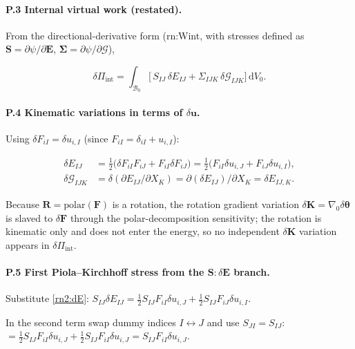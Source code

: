 \documentclass[11pt]{article}
\begin{document}
\paragraph{P.3 Internal virtual work (restated).}

From the directional-derivative form (rn:Wint, with stresses defined as $\mathbf{S}=\partial\psi/\partial\mathbf{E}$, $\boldsymbol{\Sigma}=\partial\psi/\partial\bm{\mathcal{G}}$),

\begin{equation}
\delta\Pi_{\mathrm{int}}
= \int_{\mathcal{B}_0}
  \bigl[\,S_{IJ}\,\delta E_{IJ}
        +\Sigma_{IJK}\,\delta\mathcal{G}_{IJK}\bigr]\,
  \mathrm{d}V_0.
\label{rn2:intvw}
\end{equation}

\paragraph{P.4 Kinematic variations in terms of $\delta\mathbf{u}$.}

Using $\delta F_{iI}=\delta u_{i,I}$ (since $F_{iI}=\delta_{iI}+u_{i,I}$):

\begin{align}
\delta E_{IJ}
 &= \tfrac12\bigl(\delta F_{iI}F_{iJ}+F_{iI}\delta F_{iJ}\bigr)
  = \tfrac12\bigl(F_{iI}\delta u_{i,J}+F_{iJ}\delta u_{i,I}\bigr),
  \label{rn2:dE}\\
\delta\mathcal{G}_{IJK}
 &= \delta(\partial E_{IJ}/\partial X_K)
  = \partial(\delta E_{IJ})/\partial X_K
  = \delta E_{IJ,K}.
  \label{rn2:dG}
\end{align}

Because $\mathbf{R}=\mathrm{polar}(\mathbf{F})$ is a rotation, the rotation gradient variation $\delta\mathbf{K}=\nabla_0\delta\boldsymbol{\theta}$ is slaved to $\delta\mathbf{F}$ through the polar-decomposition sensitivity; the rotation is kinematic only and does not enter the energy, so no independent $\delta\mathbf{K}$ variation appears in $\delta\Pi_{\mathrm{int}}$.

\paragraph{P.5 First Piola--Kirchhoff stress from the $\mathbf{S}:\delta\mathbf{E}$ branch.}

Substitute \eqref{rn2:dE}:
$S_{IJ}\delta E_{IJ}
= \tfrac12 S_{IJ}F_{iI}\delta u_{i,J}+\tfrac12 S_{IJ}F_{iJ}\delta u_{i,I}$.

In the second term swap dummy indices $I\leftrightarrow J$ and use $S_{JI}=S_{IJ}$:
$= \tfrac12 S_{IJ}F_{iI}\delta u_{i,J}+\tfrac12 S_{IJ}F_{iI}\delta u_{i,J}
= S_{IJ}F_{iI}\delta u_{i,J}$.
\end{document}
